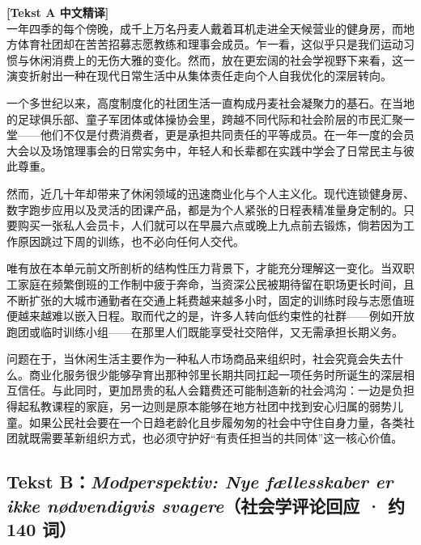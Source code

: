\begin{transbox}
\small
\textbf{\color{NCDTeal}[Tekst A 中文精译]}\\
一年四季的每个傍晚，成千上万名丹麦人戴着耳机走进全天候营业的健身房，而地方体育社团却在苦苦招募志愿教练和理事会成员。乍一看，这似乎只是我们运动习惯与休闲消费上的无伤大雅的变化。然而，放在更宏阔的社会学视野下来看，这一演变折射出一种在现代日常生活中从集体责任走向个人自我优化的深层转向。

一个多世纪以来，高度制度化的社团生活一直构成丹麦社会凝聚力的基石。在当地的足球俱乐部、童子军团体或体操协会里，跨越不同代际和社会阶层的市民汇聚一堂——他们不仅是付费消费者，更是承担共同责任的平等成员。在一年一度的会员大会以及场馆理事会的日常实务中，年轻人和长辈都在实践中学会了日常民主与彼此尊重。

然而，近几十年却带来了休闲领域的迅速商业化与个人主义化。现代连锁健身房、数字跑步应用以及灵活的团课产品，都是为个人紧张的日程表精准量身定制的。只要购买一张私人会员卡，人们就可以在早晨六点或晚上九点前去锻炼，倘若因为工作原因跳过下周的训练，也不必向任何人交代。

唯有放在本单元前文所剖析的结构性压力背景下，才能充分理解这一变化。当双职工家庭在频繁倒班的工作制中疲于奔命，当资深公民被期待留在职场更长时间，且不断扩张的大城市通勤者在交通上耗费越来越多小时，固定的训练时段与志愿值班便越来越难以嵌入日程。取而代之的是，许多人转向低约束性的社群——例如开放跑团或临时训练小组——在那里人们既能享受社交陪伴，又无需承担长期义务。

问题在于，当休闲生活主要作为一种私人市场商品来组织时，社会究竟会失去什么。商业化服务很少能够孕育出那种邻里长期共同扛起一项任务时所诞生的深层相互信任。与此同时，更加昂贵的私人会籍费还可能制造新的社会鸿沟：一边是负担得起私教课程的家庭，另一边则是原本能够在地方社团中找到安心归属的弱势儿童。如果公民社会要在一个日趋老龄化且步履匆匆的社会中守住自身力量，各类社团就既需要革新组织方式，也必须守护好“有责任担当的共同体”这一核心价值。
\end{transbox}

\subsection*{Tekst B：\textit{Modperspektiv: Nye fællesskaber er ikke nødvendigvis svagere}（社会学评论回应 · 约 140 词）}

